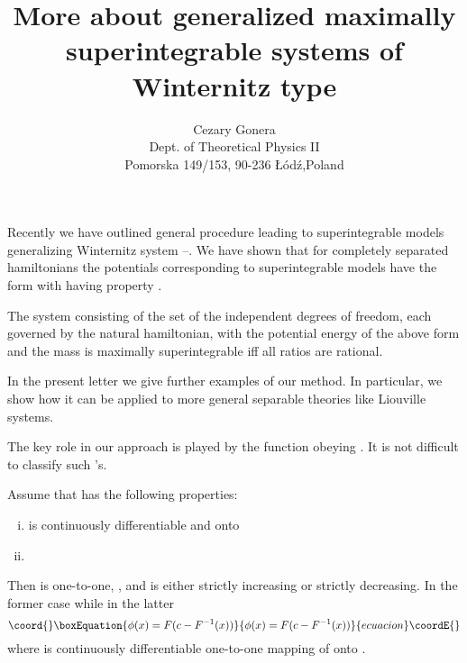 \documentclass[a4paper,12pt]{article}
\author{Cezary Gonera\\
Dept. of Theoretical Physics II\\
Pomorska 149/153, 90-236 \L{}\'od\'z,Poland}
\title{More about generalized maximally superintegrable systems of Winternitz type}
\providecommand{\mId}{\mbox{\rm id}}
\providecommand{\mR}{{\mathbb R}}
\begin{document}
\maketitle
{}
\vspace{0.5cm}


Recently we have outlined  \cite{1} 
general procedure leading to superintegrable models generalizing Winternitz 
system \cite{1}--\cite{6}. 
We have shown that for completely separated hamiltonians the potentials corresponding to 
superintegrable models have the form \coordHE{} with \coordHE{} having property 
\coordHE{}. 

The system consisting of the set of the independent degrees of freedom, each
governed by the natural hamiltonian, with the potential energy of the above form  and the mass \coordHE{} is
maximally superintegrable iff all ratios \coordHE{}
are rational.

In the present letter we give further examples of our method. In particular, we show how it
 can be applied to more general separable theories like Liouville systems.

The key role in our approach is played by the function \coordHE{} obeying \myHighlight{$\phi\circ\phi=\mId$}\coordHE{}. 
It is not difficult to classify such \myHighlight{$\phi$}\coordHE{}'s.

Assume that \myHighlight{$\phi$}\coordHE{} has the following properties:
\begin{enumerate}[i)]
\item \myHighlight{$\phi:\mR\rightarrow\mR$}\coordHE{} is continuously differentiable and onto
\item \myHighlight{$\phi\circ\phi=\mId$}\coordHE{}
\end{enumerate}
Then \myHighlight{$\phi$}\coordHE{} is one-to-one, \coordHE{}, and  \myHighlight{$\phi$}\coordHE{} is either strictly increasing or strictly 
decreasing. In the former case \coordHE{} while in the latter
\begin{equation}\coord{}\boxEquation{
\phi(x)=F(c-F^{-1}(x))
\label{w1}
}{
\phi(x)=F(c-F^{-1}(x))
}{ecuacion}\coordE{}\end{equation}
where \myHighlight{$F:\mR\rightarrow\mR$}\coordHE{} is continuously differentiable one-to-one mapping of \myHighlight{$\mR$}\coordHE{} onto \myHighlight{$\mR$}\coordHE{}.
\end{document}
